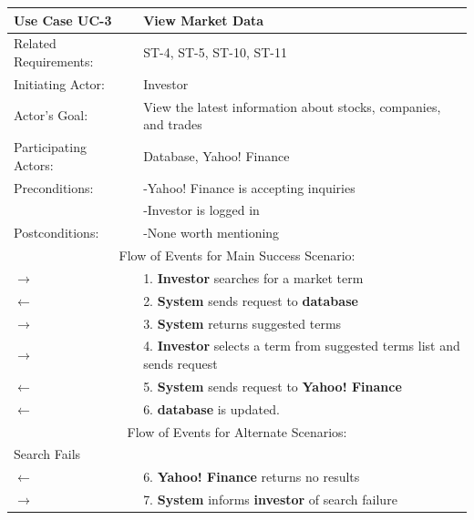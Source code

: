 \begin{centering}
\renewcommand\arraystretch{1.3}
\label{UC-3}
\begin{longtable}{|p{1.2in} p{5in}|}
\hline
\bfseries{\color{color1}Use Case UC-3} &
\bfseries{\color{color1}View Market Data} \\
\hline
Related Requirements: & ST-4, ST-5, ST-10, ST-11 \\
Initiating Actor:     & Investor \\
Actor's Goal:         & View the latest information about stocks, companies, and trades\\
Participating Actors: & Database, Yahoo! Finance \\
Preconditions:        & -Yahoo! Finance is accepting inquiries \\
                      & -Investor is logged in \\
Postconditions:       & -None worth mentioning \\

\hline
\multicolumn{2}{|c|}{\color{color1}Flow of Events for Main Success Scenario:}\\
\hline

$\rightarrow$ & 1. \textbf{Investor} searches for a market term  \\
 $\leftarrow$ & 2. \textbf{System} sends request to \textbf{database} \\
$\rightarrow$ & 3. \textbf{System} returns suggested terms \\
$\rightarrow$ & 4. \textbf{Investor} selects a term from suggested terms list and sends request \\
$\leftarrow$ & 5. \textbf{System} sends request to \textbf{Yahoo! Finance} \\
$\leftarrow$ & 6. \textbf{database} is updated. \\
\hline

\multicolumn{2}{|c|}{\color{color1}Flow of Events for Alternate Scenarios:} \\
\hline

\multicolumn{2}{|p{6.2in}|}{Search Fails} \\
\hline

$\leftarrow$ & 6. \textbf{Yahoo! Finance} returns no results \\
$\rightarrow$ & 7. \textbf{System} informs \textbf{investor} of search failure \\

\hline

\end{longtable}
\end{centering}

